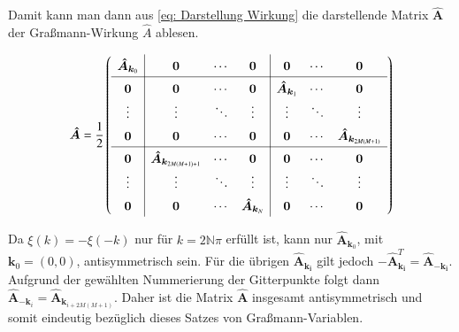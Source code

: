 \noindent Damit kann man dann aus \eqref{eq: Darstellung Wirkung} die darstellende Matrix $\bm{\hat{A}}$ der Graßmann-Wirkung $\hat{A}$ ablesen. 
\begin{grayframe}[frametitle = { Darstellende Matrix der fouriertransformierten Graßmann-Wikrung $\hat{A}$ }]
\begin{equation} \label{eq: Darstellung Matrix Wirkung}
\renewcommand{\arraystretch}{1.5}
\bm{\hat{A}} = \frac{1}{2}
\left(\begin{array}{c|ccc|ccc} 
\bm{\hat{A}}_{\bm{k}_0}  & \bm{0}   & \cdots    & \bm{0} & \bm{0} & \cdots  & \bm{0} \\ \hline
\bm{0}  & \bm{0}       & \cdots   & \bm{0}    & \bm{\hat{A}}_{\bm{k}_1} & \cdots  & \bm{0} \\
\vdots  &\vdots        & \ddots   & \vdots    & \vdots                  & \ddots  & \vdots \\
\bm{0}  & \bm{0}       & \cdots   & \bm{0} & \bm{0} & \cdots  & \bm{\hat{A}}_{\bm{k}_{2M(M+1)}}  \\ \hline
\bm{0}  & \bm{\hat{A}}_{\bm{k}_{2M(M+1)+1}} & \cdots  & \bm{0} & \bm{0} & \cdots  & \bm{0} \\
\vdots  &\vdots        & \ddots   & \vdots    & \vdots                  & \ddots  & \vdots \\
\bm{0}  & \bm{0}       & \cdots   &\bm{\hat{A}}_{\bm{k}_{N}} & \bm{0} & \cdots  & \bm{0} 
\end{array} \right) 
\end{equation}
\end{grayframe}

\noindent Da $\xi(k) = - \xi(-k)  $ nur für $k = 2\mathbb{N}\pi$ erfüllt ist, kann nur  $\bm{\hat{A}}_{\bm{k}_0}$, mit ${\bm{k}_0} = (0,0)$, antisymmetrisch sein. Für die übrigen $\bm{\hat{A}}_{\bm{k_i}}$ gilt jedoch $-\bm{\hat{A}}_{\bm{k_i}}^T = \bm{\hat{A}}_{-\bm{k_i}}$. Aufgrund der gewählten Nummerierung der Gitterpunkte folgt dann $\bm{\hat{A}}_{-\bm{k}_i} = \bm{\hat{A}}_{\bm{k}_{i+2M(M+1)}}$. 
Daher ist die Matrix $\hat{\bm{A}}$ insgesamt antisymmetrisch und somit eindeutig bezüglich dieses Satzes von Graßmann-Variablen. 

